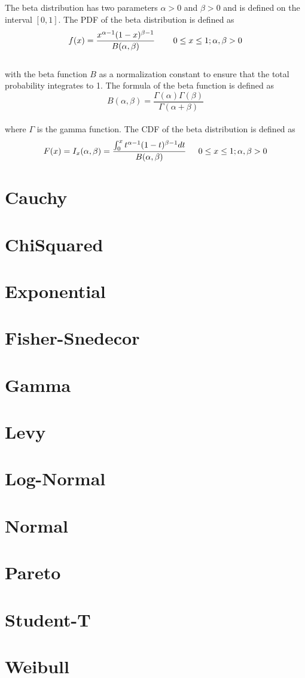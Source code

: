 		The beta distribution has two parameters $\alpha > 0$ and $\beta > 0$ and is defined on the interval $[0,1]$. The \ac{PDF} of the beta distribution is defined as
		\\
		$$f(x) = \frac{x^{\alpha-1}(1-x)^{\beta-1}}{B(\alpha,\beta)}  \hspace{.3in} 0 \le x \le 1; \alpha, \beta > 0$$
		\\
		with the beta function $B$ as a normalization constant to ensure that the total probability integrates to 1. The formula of the beta function is defined as
		\\
		$$B(\alpha,\beta) = \frac{\Gamma(\alpha)\Gamma(\beta)}{\Gamma(\alpha + \beta)}$$
		\\
		where $\Gamma$ is the gamma function. The \ac{CDF} of the beta distribution is defined as
		\\
		$$F(x) = I_{x}(\alpha,\beta) = \frac{\int_{0}^{x}{t^{\alpha-1}(1-t)^{\beta-1}dt}}{B(\alpha,\beta)} \hspace{.2in} 0 \le x \le 1; \alpha, \beta > 0$$

	\section{Cauchy}

	\section{ChiSquared}

	\section{Exponential}

	\section{Fisher-Snedecor}

	\section{Gamma}

	\section{Levy}

	\section{Log-Normal}

	\section{Normal}

	\section{Pareto}

	\section{Student-T}

	\section{Weibull}